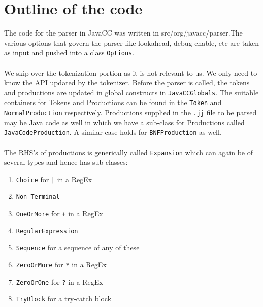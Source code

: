 \documentclass[oneside]{book}
\begin{document}
\section{Outline of the code}
The code for the parser in JavaCC was written in src/org/javacc/parser.The various options that govern the parser like lookahead, debug-enable, etc are taken as input and pushed into a class \texttt{Options}.\\\\We skip over the tokenization portion as it is not relevant to us. We only need to know the API updated by the tokenizer. Before the parser is called, the tokens and productions are updated in global constructs in \texttt{JavaCCGlobals}. The suitable containers for Tokens and Productions can be found in the \texttt{Token} and \texttt{NormalProduction} respectively. Productions supplied in the \texttt{.jj} file to be parsed may be Java code as well in which we have a sub-class for Productions called \texttt{JavaCodeProduction}. A similar case holds for \texttt{BNFProduction} as well.\\\\The RHS's of productions is generically called \texttt{Expansion} which can again be of several types and hence has sub-classes:
\begin{enumerate}
\item \texttt{Choice} for \texttt{|} in a RegEx
\item \texttt{Non-Terminal}
\item \texttt{OneOrMore} for \texttt{+} in a RegEx
\item \texttt{RegularExpression}
\item \texttt{Sequence} for a sequence of any of these
\item \texttt{ZeroOrMore} for \texttt{*} in a RegEx
\item \texttt{ZeroOrOne} for \texttt{?} in a RegEx
\item \texttt{TryBlock} for a try-catch block
\end{enumerate}
\end{document}
